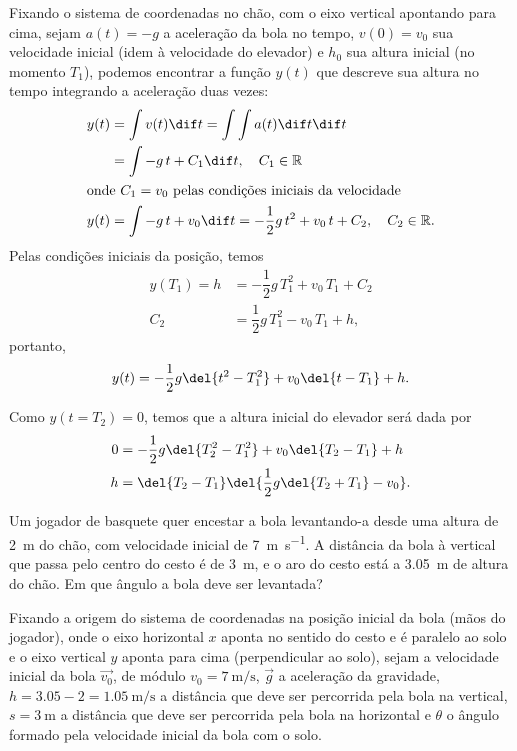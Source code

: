 \documentclass[]{IMTexam}
\begin{document}
\begin{questions}
	\begin{solution}
		Fixando o sistema de coordenadas no chão, com o eixo vertical apontando para cima, sejam $ a(t)=-g $ a aceleração da bola no tempo, $ v(0)=v_0 $ sua velocidade inicial (idem à velocidade do elevador) e $ h_0 $ sua altura inicial (no momento $ T_1 $), podemos encontrar a função $ y(t) $ que descreve sua altura no tempo integrando a aceleração duas vezes:
		\begin{align*}
			y(t) & =\int v(t)\dif t=\int\int a(t) \dif t\dif t                                    \\
			     & =\int -g\,t+C_1\dif t,\quad C_1\in\mathbb{R}                                   \\
			\intertext{onde $ C_1=v_0 $ pelas condições iniciais da velocidade}
			y(t) & =\int -g\,t+v_0\dif t=-\dfrac{1}{2}g\,t^{2}+v_0\,t+C_2,\quad C_2\in\mathbb{R}.
		\end{align*}
		Pelas condições iniciais da posição, temos
		\begin{align*}
			y(T_1)=h & =-\dfrac{1}{2}g\,T_1^{2}+v_0\,T_1+C_2 \\
			C_2      & =\dfrac{1}{2}g\,T_1^{2}-v_0\,T_1+h,
		\end{align*}
		portanto,
		\begin{equation}\label{eq:ytbe}
			y(t)=-\dfrac{1}{2}g\del{t^{2}-T_1^{2}}+v_0\del{t-T_1}+h.
		\end{equation}

		Como $ y(t=T_2)=0 $, temos que a altura inicial do elevador será dada por
		\begin{align*}
			0 & =-\dfrac{1}{2}g\del{T_2^{2}-T_1^{2}}+v_0\del{T_2-T_1}+h \\
			h & =\del{T_2-T_1}\del{\dfrac{1}{2}g\del{T_2+T_1}-v_0}.
		\end{align*}
	\end{solution}

	\question Um jogador de basquete quer encestar a bola levantando-a desde uma altura de \SI{2}{\meter} do chão, com velocidade inicial de \SI{7}{\meter\per\second}. A distância da bola à vertical que passa pelo centro do cesto é de \SI{3}{\meter}, e o aro do cesto está a \SI{3.05}{\meter} de altura do chão. Em que ângulo a bola deve ser levantada?

	\begin{solution}
		Fixando a origem do sistema de coordenadas na posição inicial da bola (mãos do jogador), onde o eixo horizontal $ x $ aponta no sentido do cesto e é paralelo ao solo e o eixo vertical $ y $ aponta para cima (perpendicular ao solo), sejam a velocidade inicial da bola $ \vec{v_0} $, de módulo $ v_0=\SI{7}{\meter\per\second} $, $ \vec{g} $ a aceleração da gravidade, $ h=\num{3.05}-2=\SI{1.05}{\meter\per\second} $ a distância que deve ser percorrida pela bola na vertical, $ s=\SI{3}{\meter} $ a distância que deve ser percorrida pela bola na horizontal e $ \theta $ o ângulo formado pela velocidade inicial da bola com o solo.


\end{solution}
\end{questions}
\end{document}

